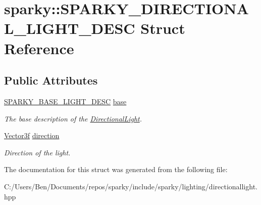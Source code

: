 \hypertarget{structsparky_1_1_s_p_a_r_k_y___d_i_r_e_c_t_i_o_n_a_l___l_i_g_h_t___d_e_s_c}{}\section{sparky\+:\+:S\+P\+A\+R\+K\+Y\+\_\+\+D\+I\+R\+E\+C\+T\+I\+O\+N\+A\+L\+\_\+\+L\+I\+G\+H\+T\+\_\+\+D\+E\+SC Struct Reference}
\label{structsparky_1_1_s_p_a_r_k_y___d_i_r_e_c_t_i_o_n_a_l___l_i_g_h_t___d_e_s_c}
\subsection*{Public Attributes}
\begin{DoxyCompactItemize}
\item 
\hyperlink{structsparky_1_1_s_p_a_r_k_y___b_a_s_e___l_i_g_h_t___d_e_s_c}{S\+P\+A\+R\+K\+Y\+\_\+\+B\+A\+S\+E\+\_\+\+L\+I\+G\+H\+T\+\_\+\+D\+E\+SC} \hyperlink{structsparky_1_1_s_p_a_r_k_y___d_i_r_e_c_t_i_o_n_a_l___l_i_g_h_t___d_e_s_c_aebc9eb0e44711825e19e79dac4e441f5}{base}\hypertarget{structsparky_1_1_s_p_a_r_k_y___d_i_r_e_c_t_i_o_n_a_l___l_i_g_h_t___d_e_s_c_aebc9eb0e44711825e19e79dac4e441f5}{}\label{structsparky_1_1_s_p_a_r_k_y___d_i_r_e_c_t_i_o_n_a_l___l_i_g_h_t___d_e_s_c_aebc9eb0e44711825e19e79dac4e441f5}

\begin{DoxyCompactList}\small\item\em The base description of the \hyperlink{classsparky_1_1_directional_light}{Directional\+Light}. \end{DoxyCompactList}\item 
\hyperlink{classsparky_1_1_vector3}{Vector3f} \hyperlink{structsparky_1_1_s_p_a_r_k_y___d_i_r_e_c_t_i_o_n_a_l___l_i_g_h_t___d_e_s_c_a56dbeae925c825847b305d04ab7fb8e2}{direction}\hypertarget{structsparky_1_1_s_p_a_r_k_y___d_i_r_e_c_t_i_o_n_a_l___l_i_g_h_t___d_e_s_c_a56dbeae925c825847b305d04ab7fb8e2}{}\label{structsparky_1_1_s_p_a_r_k_y___d_i_r_e_c_t_i_o_n_a_l___l_i_g_h_t___d_e_s_c_a56dbeae925c825847b305d04ab7fb8e2}

\begin{DoxyCompactList}\small\item\em Direction of the light. \end{DoxyCompactList}\end{DoxyCompactItemize}


The documentation for this struct was generated from the following file\+:\begin{DoxyCompactItemize}
\item 
C\+:/\+Users/\+Ben/\+Documents/repos/sparky/include/sparky/lighting/directionallight.\+hpp\end{DoxyCompactItemize}
